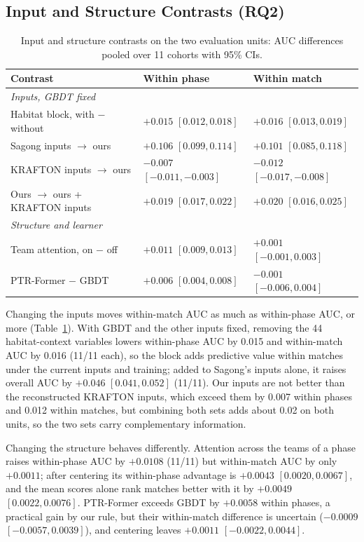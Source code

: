 \documentclass[sigconf,anonymous]{acmart}
\begin{document}
\subsection{Input and Structure Contrasts (RQ2)}
\label{sec:results:inputs}
\begin{table}[t]
\centering\scriptsize
\caption{Input and structure contrasts on the two evaluation units: AUC differences pooled over 11 cohorts with 95\% CIs.}
\label{tab:contrasts}
\setlength{\tabcolsep}{2.5pt}
\begin{tabular}{lll}
\toprule
Contrast & Within phase & Within match \\
\midrule
\multicolumn{3}{l}{\emph{Inputs, GBDT fixed}} \\
Habitat block, with $-$ without & $+0.015$ $[0.012, 0.018]$ & $+0.016$ $[0.013, 0.019]$ \\
Sagong inputs $\to$ ours & $+0.106$ $[0.099, 0.114]$ & $+0.101$ $[0.085, 0.118]$ \\
KRAFTON inputs $\to$ ours & $-0.007$ $[-0.011, -0.003]$ & $-0.012$ $[-0.017, -0.008]$ \\
Ours $\to$ ours + KRAFTON inputs & $+0.019$ $[0.017, 0.022]$ & $+0.020$ $[0.016, 0.025]$ \\
\midrule
\multicolumn{3}{l}{\emph{Structure and learner}} \\
Team attention, on $-$ off & $+0.011$ $[0.009, 0.013]$ & $+0.001$ $[-0.001, 0.003]$ \\
PTR-Former $-$ GBDT & $+0.006$ $[0.004, 0.008]$ & $-0.001$ $[-0.006, 0.004]$ \\
\bottomrule
\end{tabular}
\end{table}
Changing the inputs moves within-match AUC as much as within-phase AUC, or more (Table~\ref{tab:contrasts}). With GBDT and the other inputs fixed, removing the 44 habitat-context variables lowers within-phase AUC by 0.015 and within-match AUC by 0.016 (11/11 each), so the block adds predictive value within matches under the current inputs and training; added to Sagong's inputs alone, it raises overall AUC by $+0.046$ $[0.041,\allowbreak 0.052]$ (11/11). Our inputs are not better than the reconstructed KRAFTON inputs, which exceed them by 0.007 within phases and 0.012 within matches, but combining both sets adds about 0.02 on both units, so the two sets carry complementary information.

Changing the structure behaves differently. Attention across the teams of a phase raises within-phase AUC by $+0.0108$ (11/11) but within-match AUC by only $+0.0011$; after centering its within-phase advantage is $+0.0043$ $[0.0020,\allowbreak 0.0067]$, and the mean scores alone rank matches better with it by $+0.0049$ $[0.0022,\allowbreak 0.0076]$. PTR-Former exceeds GBDT by $+0.0058$ within phases, a practical gain by our rule, but their within-match difference is uncertain ($-0.0009$ $[-0.0057,\allowbreak 0.0039]$), and centering leaves $+0.0011$ $[-0.0022,\allowbreak 0.0044]$.
\end{document}
